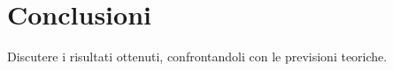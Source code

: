 \section{Conclusioni}
Discutere i risultati ottenuti, confrontandoli con le previsioni teoriche.

\newpage

